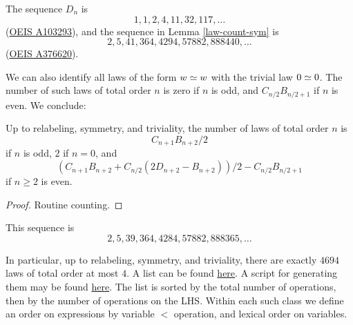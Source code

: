 The sequence $D_n$ is
$$ 1, 1, 2, 4, 11, 32, 117, \dots$$
(\href{https://oeis.org/A103293}{OEIS A103293}), and the sequence in Lemma \ref{law-count-sym} is
$$ 2, 5, 41, 364, 4294, 57882, 888440, \dots$$
(\href{https://oeis.org/A376620}{OEIS A376620}).

We can also identify all laws of the form $w \simeq w$ with the trivial law $0 \simeq 0$.  The number of such laws of total order $n$ is zero if $n$ is odd, and $C_{n/2} B_{n/2+1}$ if $n$ is even.  We conclude:

\begin{lemma}  Up to relabeling, symmetry, and triviality, the number of laws of total order $n$ is
$$ C_{n+1} B_{n+2}/2$$
if $n$ is odd, $2$ if $n = 0$, and
$$ (C_{n+1} B_{n+2} + C_{n/2} (2D_{n+2} - B_{n+2}))/2 - C_{n/2} B_{n/2+1}$$
if $n \geq 2$ is even.
\end{lemma}

\begin{proof} Routine counting.
\end{proof}

This sequence is
$$2, 5, 39, 364, 4284, 57882, 888365, \dots$$

In particular, up to relabeling, symmetry, and triviality, there are exactly $4694$ laws of total order at most $4$.  A list can be found \href{https://github.com/teorth/equational_theories/blob/main/data/equations.txt}{here}.  A script for generating them may be found \href{https://github.com/teorth/equational_theories/blob/main/scripts/generate_eqs_list.py}{here}.  The list is sorted by the total number of operations, then by the number of operations on the LHS. Within each such class we define an order on expressions by variable $<$ operation, and lexical order on variables.
